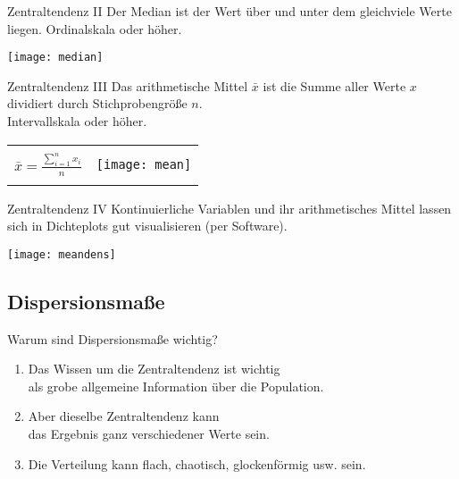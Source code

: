 \begin{frame}
  {Zentraltendenz II}
  Der \alert{Median} ist der Wert \alert{über und unter dem gleichviele Werte} liegen. \alert{Ordinalskala oder höher.}
  \vspace{-2cm}
  \begin{center}
    \texttt{[image: median]}
  \end{center}
\end{frame}

\begin{frame}
  {Zentraltendenz III}
  Das \alert{arithmetische Mittel} $\bar{x}$ ist die Summe aller Werte $x$\\
  dividiert durch Stichprobengröße $n$.\\
  \alert{Intervallskala oder höher.}
  \vspace{-2cm}
  \begin{center}
    \begin{tabular}[!h]{cc}
      \vspace{1.5cm} & \multirow{3}{*}{\texttt{[image: mean]}} \\
      $\bar{x}=\frac{\sum\limits_{i=1}^{n}x_i}{n}$ \hspace{1.5cm} &  \\
      \vspace{1.5cm} & \\
    \end{tabular}
  \end{center}
\end{frame}

\begin{frame}
  {Zentraltendenz IV}
  Kontinuierliche Variablen und ihr arithmetisches Mittel lassen sich in \alert{Dichteplots} gut visualisieren (per Software).
    \vspace{-2cm}
  \begin{center}
    \texttt{[image: meandens]}
  \end{center}
\end{frame}


\subsection{Dispersionsmaße}

\begin{frame}
  {Warum sind Dispersionsmaße wichtig?}
  \begin{enumerate}[<+->]
    \item Das Wissen um die Zentraltendenz ist wichtig\\
      als grobe allgemeine Information über die Population.
    \item Aber dieselbe Zentraltendenz kann\\
      das Ergebnis ganz verschiedener Werte sein.
    \item Die Verteilung kann flach, chaotisch, glockenförmig usw. sein.
  \end{enumerate}
\end{frame}

